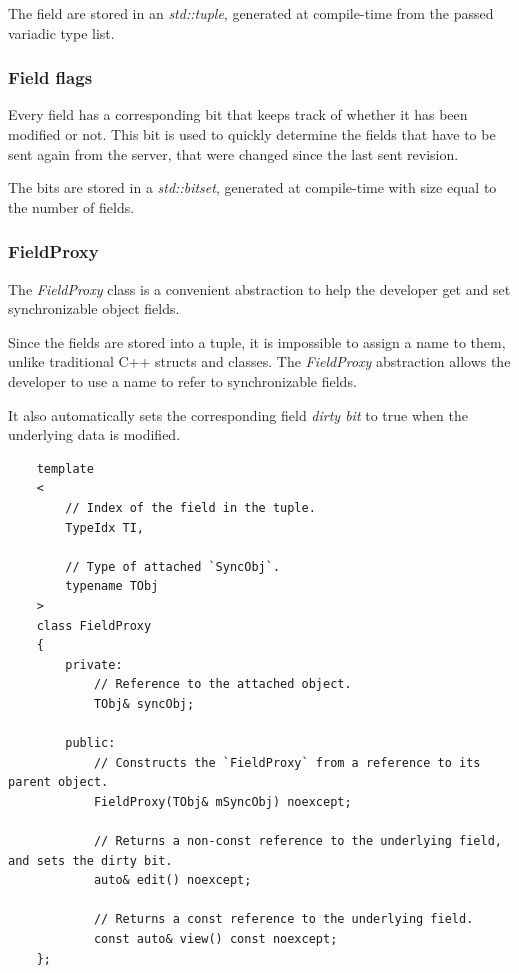\documentclass{report}
\begin{document}
                    The field are stored in an \emph{std::tuple}, generated at compile-time from the passed variadic type list.

                \subsubsection{Field flags}

                    Every field has a corresponding bit that keeps track of whether it has been modified or not. 
                    This bit is used to quickly determine the fields that have to be sent again from the server, that were changed since the last sent revision.

                    The bits are stored in a \emph{std::bitset}, generated at compile-time with size equal to the number of fields.

                \subsubsection{FieldProxy}

                    The \emph{FieldProxy} class is a convenient abstraction to help the developer get and set synchronizable object fields.

                    Since the fields are stored into a tuple, it is impossible to assign a name to them, unlike traditional C++ structs and classes.
                    The \emph{FieldProxy} abstraction allows the developer to use a name to refer to synchronizable fields.

                    It also automatically sets the corresponding field \emph{dirty bit} to true when the underlying data is modified.

\begin{verbatim}
    template
    <
        // Index of the field in the tuple.
        TypeIdx TI, 

        // Type of attached `SyncObj`.
        typename TObj
    > 
    class FieldProxy
    {
        private:
            // Reference to the attached object.
            TObj& syncObj;

        public:
            // Constructs the `FieldProxy` from a reference to its parent object.
            FieldProxy(TObj& mSyncObj) noexcept;

            // Returns a non-const reference to the underlying field, and sets the dirty bit.
            auto& edit() noexcept;

            // Returns a const reference to the underlying field.
            const auto& view() const noexcept;
    };
\end{verbatim}
\end{document}
